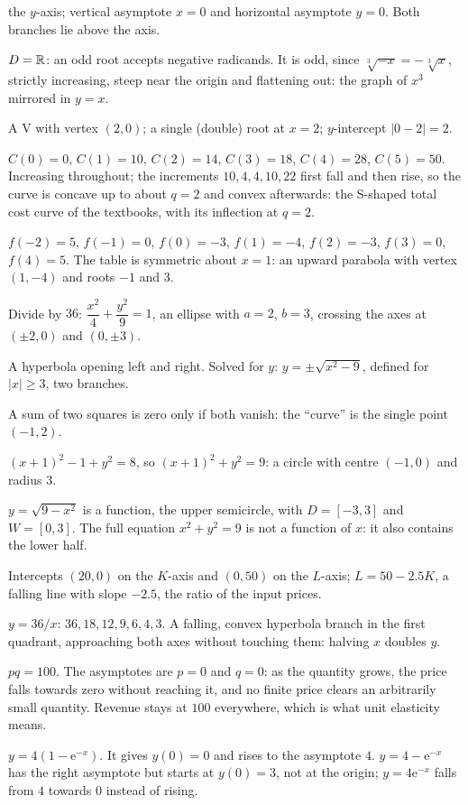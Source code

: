 \begin{solutions}
        the $y$-axis; vertical asymptote $x=0$ and horizontal asymptote
        $y=0$. Both branches lie above the axis.
  \item $D=\mathbb{R}$: an odd root accepts negative radicands. It is odd, since
        $\sqrt[3]{-x}=-\sqrt[3]{x}$, strictly increasing, steep near the
        origin and flattening out: the graph of $x^{3}$ mirrored in
        $y=x$.
  \item A V with vertex $(2,0)$; a single (double) root at $x=2$;
        $y$-intercept $|0-2|=2$.
  \item $C(0)=0$, $C(1)=10$, $C(2)=14$, $C(3)=18$, $C(4)=28$, $C(5)=50$.
        Increasing throughout; the increments $10,4,4,10,22$ first fall and
        then rise, so the curve is concave up to about $q=2$ and convex
        afterwards: the S-shaped total cost curve of the textbooks, with
        its inflection at $q=2$.
  \item $f(-2)=5$, $f(-1)=0$, $f(0)=-3$, $f(1)=-4$, $f(2)=-3$, $f(3)=0$,
        $f(4)=5$. The table is symmetric about $x=1$: an upward parabola
        with vertex $(1,-4)$ and roots $-1$ and $3$.
  \item Divide by $36$: $\dfrac{x^{2}}{4}+\dfrac{y^{2}}{9}=1$, an ellipse
        with $a=2$, $b=3$, crossing the axes at $(\pm2,0)$ and
        $(0,\pm3)$.
  \item A hyperbola opening left and right. Solved for $y$:
        $y=\pm\sqrt{x^{2}-9}$, defined for $|x|\ge3$, two branches.
  \item A sum of two squares is zero only if both vanish: the ``curve'' is
        the single point $(-1,2)$.
  \item $(x+1)^{2}-1+y^{2}=8$, so $(x+1)^{2}+y^{2}=9$: a circle with centre
        $(-1,0)$ and radius $3$.
  \item $y=\sqrt{9-x^{2}}$ is a function, the upper semicircle, with
        $D=[-3,3]$ and $W=[0,3]$. The full equation $x^{2}+y^{2}=9$ is not
        a function of $x$: it also contains the lower half.
  \item Intercepts $(20,0)$ on the $K$-axis and $(0,50)$ on the $L$-axis;
        $L=50-2.5K$, a falling line with slope $-2.5$, the ratio of the
        input prices.
  \item $y=36/x$: $36,18,12,9,6,4,3$. A falling, convex hyperbola branch in
        the first quadrant, approaching both axes without touching them:
        halving $x$ doubles $y$.
  \item $pq=100$. The asymptotes are $p=0$ and $q=0$: as the quantity
        grows, the price falls towards zero without reaching it, and no
        finite price clears an arbitrarily small quantity. Revenue stays at
        $100$ everywhere, which is what unit elasticity means.
  \item $y=4(1-\mathrm{e}^{-x})$. It gives $y(0)=0$ and rises to the
        asymptote $4$. \;$y=4-\mathrm{e}^{-x}$ has the right asymptote but
        starts at $y(0)=3$, not at the origin; \;$y=4\mathrm{e}^{-x}$ falls
        from $4$ towards $0$ instead of rising.
\end{solutions}
